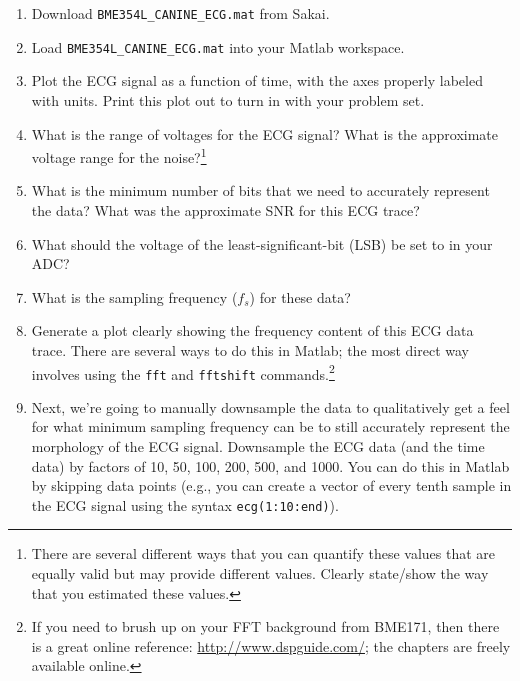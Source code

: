 \begin{enumerate}
\item Download \verb+BME354L_CANINE_ECG.mat+ from Sakai.

\item Load \verb+BME354L_CANINE_ECG.mat+ into your Matlab workspace.

\item Plot the ECG signal as a function of time, with the axes properly labeled
with units.  Print this plot out to turn in with your problem set.

\item What is the range of voltages for the ECG signal?  What is the
approximate voltage range for the noise?\footnote{There are several different
ways that you can quantify these values that are equally valid but may provide
different values.  Clearly state/show the way that you estimated these values.}

\item What is the minimum number of bits that we need to accurately represent
the data?  What was the approximate SNR for this ECG trace?

\item What should the voltage of the least-significant-bit (LSB) be set to in
your ADC? 

\item What is the sampling frequency ($f_s$) for these data? 


\item Generate a plot clearly showing the frequency content of this ECG data trace. There are
several ways to do this in Matlab; the most direct way involves using the
\verb+fft+ and \verb+fftshift+ commands.\footnote{If you need
to brush up on your FFT background from BME171, then there is a great online
reference: \url{http://www.dspguide.com/}; the chapters are freely available
online.} 

\item Next, we're going to manually downsample the data to qualitatively get a
feel for what minimum sampling frequency can be to still accurately represent
the morphology of the ECG signal.  Downsample the ECG data (and the time data)
by factors of 10, 50, 100, 200, 500, and 1000.  You can do this in Matlab by
skipping data points (e.g., you can create a vector of every tenth sample in
the ECG signal using the syntax \verb+ecg(1:10:end)+).


\end{enumerate}
